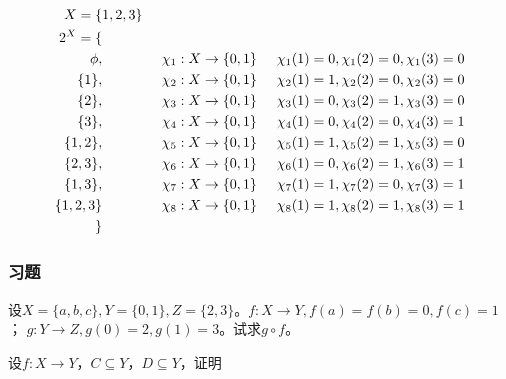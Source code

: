 \documentclass{beamer}
\begin{document}
\begin{CJK*}{UTF8}{gbsn}
\begin{frame}
  \begin{align*}
    X=\{&1,2,3\}\\
    2^X=\{&\\
        \phi,&\hspace{1.5cm}\chi_1:X\to \{0,1\}\hspace{0.5cm} \chi_1(1)=0,\chi_1(2)=0,\chi_1(3)=0\\
    \{1\},&\hspace{1.5cm}\chi_2:X\to \{0,1\}\hspace{0.5cm} \chi_2(1)=1,\chi_2(2)=0,\chi_2(3)=0\\
        \{2\},&\hspace{1.5cm}\chi_3:X\to \{0,1\}\hspace{0.5cm} \chi_3(1)=0,\chi_3(2)=1,\chi_3(3)=0\\
    \{3\},&\hspace{1.5cm}\chi_4:X\to \{0,1\}\hspace{0.5cm} \chi_4(1)=0,\chi_4(2)=0,\chi_4(3)=1\\
    \{1,2\},&\hspace{1.5cm}\chi_5:X\to \{0,1\}\hspace{0.5cm} \chi_5(1)=1,\chi_5(2)=1,\chi_5(3)=0\\
    \{2,3\},&\hspace{1.5cm}\chi_6:X\to \{0,1\}\hspace{0.5cm} \chi_6(1)=0,\chi_6(2)=1,\chi_6(3)=1\\
    \{1,3\},&\hspace{1.5cm}\chi_7:X\to \{0,1\}\hspace{0.5cm} \chi_7(1)=1,\chi_7(2)=0,\chi_7(3)=1\\
    \{1,2,3\}&\hspace{1.5cm}\chi_8:X\to \{0,1\}\hspace{0.5cm} \chi_8(1)=1,\chi_8(2)=1,\chi_8(3)=1\\
    \}\\
  \end{align*}
\end{frame}
\begin{frame}
  \frametitle{习题}
    \begin{Exercise}
  设$X=\{a,b,c\}, Y=\{0,1\}, Z=\{2,3\}$。$f:X \to Y, f(a) = f(b) = 0, f(c) = 1$；
  $g:Y\to Z, g(0) = 2, g(1) = 3$。试求$g\circ f$。
  \end{Exercise}
  \begin{Exercise}
    设$f:X \to Y$，$C \subseteq Y$，$D \subseteq Y$，证明


\end{Exercise}
\end{frame}
\end{CJK*}
\end{document}
